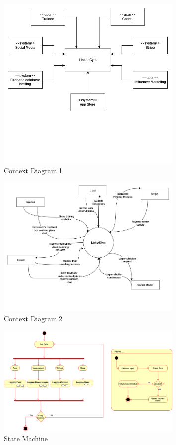 \begin{figure}[H]
  \centering
  \includegraphics[width=0.8\textwidth]{images/context_diagram1.png}
  \caption{Context Diagram 1}
  \label{fig:contextDiagram1}
\end{figure}

\begin{figure}[H]
  \centering
  \includegraphics[width=0.8\textwidth]{images/context_diagram2.png}
  \caption{Context Diagram 2}
  \label{fig:contextDiagram2}
\end{figure}

\begin{figure}[H]
    \centering
    \includegraphics[width=0.8\textwidth]{images/state_machine.png}    
    \caption{State Machine}
    \label{fig:state_machine}
\end{figure}

